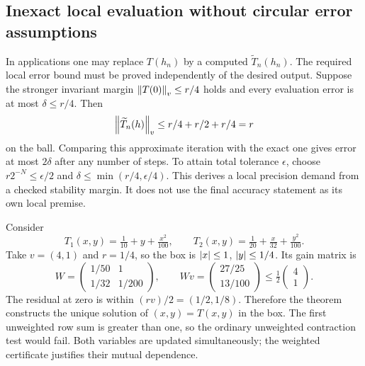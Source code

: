 \subsection{Inexact local evaluation without circular error assumptions}

In applications one may replace \(T(h_n)\) by a computed \(\widetilde T_n(h_n)\). The required local error bound must be proved independently of the desired output. Suppose the stronger invariant margin \(\left\lVert T(0)\right\rVert_v\le r/4\) holds and every evaluation error is at most \(\delta\le r/4\). Then
\[
 \left\lVert\widetilde T_n(h)\right\rVert_v\le r/4+r/2+r/4=r
\]
on the ball. Comparing this approximate iteration with the exact one gives error at most \(2\delta\) after any number of steps. To attain total tolerance \(\epsilon\), choose
\(r2^{-N}\le\epsilon/2\) and
\(\delta\le\min(r/4,\epsilon/4)\).
This derives a local precision demand from a checked stability margin. It does not use the final accuracy statement as its own local premise.

\begin{example}
Consider
\[
 T_1(x,y)=\tfrac1{10}+y+\tfrac{x^2}{100},\qquad
 T_2(x,y)=\tfrac1{20}+\tfrac{x}{32}+\tfrac{y^2}{100}.
\]
Take \(v=(4,1)\) and \(r=1/4\), so the box is \(\left|x\right|\le1\), \(\left|y\right|\le1/4\). Its gain matrix is
\[
 W=\begin{pmatrix}1/50&1\\1/32&1/200\end{pmatrix},\qquad
 Wv=\begin{pmatrix}27/25\\13/100\end{pmatrix}
 \le\tfrac12\begin{pmatrix}4\\1\end{pmatrix}.
\]
The residual at zero is within \((rv)/2=(1/2,1/8)\). Therefore the theorem constructs the unique solution of \((x,y)=T(x,y)\) in the box. The first unweighted row sum is greater than one, so the ordinary unweighted contraction test would fail. Both variables are updated simultaneously; the weighted certificate justifies their mutual dependence.
\end{example}
